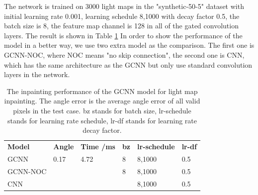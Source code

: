 \documentclass[border=15pt, multi, tikz]{article}
\newcommand{\tabhead}[1]{\textbf{#1}}
\begin{document}
The network is trained on 3000 light maps in the "synthetic-50-5" dataset with initial learning rate 0.001, learning schedule 8,1000 with decay factor 0.5, the batch size is 8, the feature map channel is 128 in all of the gated convolution layers. The result is shown in Table \ref{tab:light-inpainting} In order to show the performance of the model in a better way, we use two extra model as the comparison. The first one is GCNN-NOC, where NOC means "no skip connection", the second one is CNN, which has the same architecture as the GCNN but only use standard convolution layers in the network. 
\begin{table}[th]
	
	\centering
	\begin{tabular}{l l l l l l }
		\tabhead{Model} & \tabhead{Angle} & \tabhead{Time /ms} & \tabhead{bz} & \tabhead{lr-schedule} & \tabhead{lr-df}\\
		GCNN  & 0.17  & 4.72 & 8 & 8,1000 & 0.5\\ 
		\hline
		GCNN-NOC  &  &  & 8 & 8,1000 & 0.5\\
		\hline
		CNN & & & & 8,1000 & 0.5\\
	\end{tabular}
	\caption{The inpainting performance of the GCNN model for light map inpainting. The angle error is the average angle error of all valid pixels in the test case. bz stands for batch size, lr-schedule stands for learning rate schedule, lr-df stands for learning rate decay factor.}	
	\label{tab:light-inpainting}
\end{table}
\end{document}
